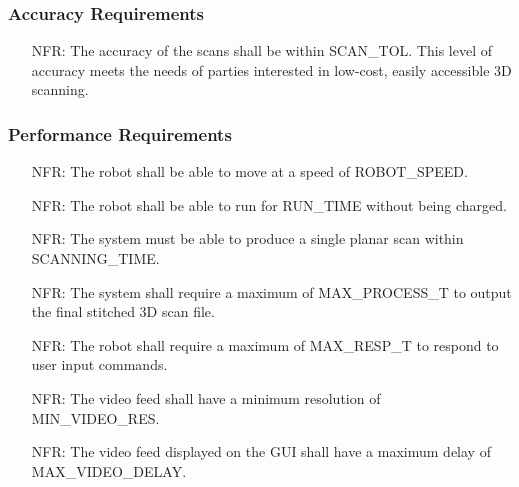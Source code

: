 \documentclass[12pt]{article}
\newcounter{nfrnum} %
\begin{document}
\subsubsection{Accuracy Requirements}
    
\noindent \begin{itemize}
\item[NFR\refstepcounter{nfrnum}\thenfrnum\label{NFR_Accuracy1}:] The accuracy of the scans shall be within SCAN\_TOL. This level of accuracy meets the needs of parties interested in low-cost, easily accessible 3D scanning.
\end{itemize}

\subsubsection{Performance Requirements}

\noindent \begin{itemize}
\item[NFR\refstepcounter{nfrnum}\thenfrnum\label{NFR_Performance1}:] The robot shall be able to move at a speed of ROBOT\_SPEED.
\item[NFR\refstepcounter{nfrnum}\thenfrnum\label{NFR_Performance2}:] The robot shall be able to run for RUN\_TIME without being charged.
\item[NFR\refstepcounter{nfrnum}\thenfrnum\label{NFR_Performance3}:] The system must be able to produce a single planar scan within SCANNING\_TIME.
\item[NFR\refstepcounter{nfrnum}\thenfrnum\label{NFR_Performance4}:] The system shall require a maximum of MAX\_PROCESS\_T to output the final stitched 3D scan file.
\item[NFR\refstepcounter{nfrnum}\thenfrnum\label{NFR_Performance5}:] The robot shall require a maximum of MAX\_RESP\_T to respond to user input commands.
\item[NFR\refstepcounter{nfrnum}\thenfrnum\label{NFR_Performance6}:] The video feed shall have a minimum resolution of MIN\_VIDEO\_RES.
\item[NFR\refstepcounter{nfrnum}\thenfrnum\label{NFR_Performance7}:] The video feed displayed on the GUI shall have a maximum delay of MAX\_VIDEO\_DELAY.
\end{itemize}
\end{document}
